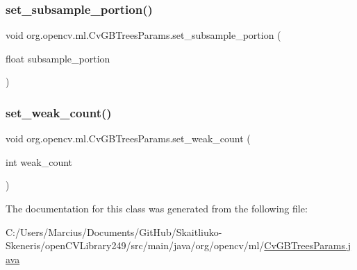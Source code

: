 \subsubsection{\texorpdfstring{set\+\_\+subsample\+\_\+portion()}{set\_subsample\_portion()}}
{\footnotesize\ttfamily void org.\+opencv.\+ml.\+Cv\+G\+B\+Trees\+Params.\+set\+\_\+subsample\+\_\+portion (\begin{DoxyParamCaption}\item[{float}]{subsample\+\_\+portion }\end{DoxyParamCaption})}

\mbox{\label{classorg_1_1opencv_1_1ml_1_1_cv_g_b_trees_params_a9c8636507d06f54e1e03ffecfd7cc62d}} 
\subsubsection{\texorpdfstring{set\+\_\+weak\+\_\+count()}{set\_weak\_count()}}
{\footnotesize\ttfamily void org.\+opencv.\+ml.\+Cv\+G\+B\+Trees\+Params.\+set\+\_\+weak\+\_\+count (\begin{DoxyParamCaption}\item[{int}]{weak\+\_\+count }\end{DoxyParamCaption})}



The documentation for this class was generated from the following file\+:\begin{DoxyCompactItemize}
\item 
C\+:/\+Users/\+Marcius/\+Documents/\+Git\+Hub/\+Skaitliuko-\/\+Skeneris/open\+C\+V\+Library249/src/main/java/org/opencv/ml/\mbox{\hyperlink{_cv_g_b_trees_params_8java}{Cv\+G\+B\+Trees\+Params.\+java}}\end{DoxyCompactItemize}
